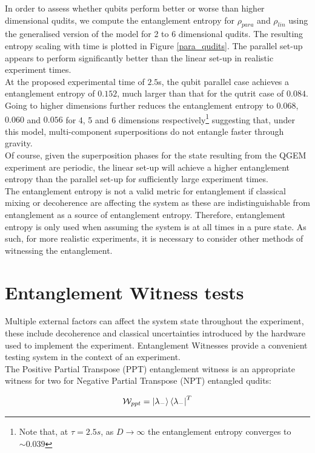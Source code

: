 \documentclass[%
 reprint,
 superscriptaddress,
 amsmath,
 amssymb,
 aps,
 longbibliography
]{revtex4-2}
\begin{document}
\indent In order to assess whether qubits perform better or worse than higher dimensional qudits, we compute the entanglement entropy for $\rho_{para}$ and $\rho_{lin}$ using the generalised version of the model for 2 to 6 dimensional qudits. The resulting entropy scaling with time is plotted in Figure \ref{para_qudits}. The parallel set-up appears to perform significantly better than the linear set-up in realistic experiment times. \\
\indent At the proposed experimental time of $2.5$s, the qubit parallel case achieves a entanglement entropy of $0.152$, much larger than that for the qutrit case of $0.084$. Going to higher dimensions further reduces the entanglement entropy to $0.068$, $0.060$ and $0.056$ for 4, 5 and 6 dimensions respectively\footnote{Note that, at $\tau=2.5s$, as $D \to \infty$ the entanglement entropy converges to $\sim0.039$} suggesting that, under this model, multi-component superpositions do not entangle faster through gravity. \\
\indent Of course, given the superposition phases for the state resulting from the QGEM experiment are periodic, the linear set-up will achieve a higher entanglement entropy than the parallel set-up for sufficiently large experiment times. \\
\indent The entanglement entropy is not a valid metric for entanglement if classical mixing or decoherence are affecting the system as these are indistinguishable from entanglement as a source of entanglement entropy. Therefore, entanglement entropy is only used when assuming the system is at all times in a pure state. As such, for more realistic experiments, it is necessary to consider other methods of witnessing the entanglement.

\section{Entanglement Witness tests\label{sec:EW}}

\indent Multiple external factors can affect the system state throughout the experiment, these include decoherence and classical uncertainties introduced by the hardware used to implement the experiment.  Entanglement Witnesses provide a convenient testing system in the context of an experiment. \\
\indent The Positive Partial Transpose (PPT) entanglement witness is an appropriate witness for two for Negative Partial Transpose (NPT) entangled qudits:

		\begin{equation}
			\mathcal{W}_{ppt}=\Ket{\lambda_-}\Bra{\lambda_-}^T
		\end{equation}
\end{document}
